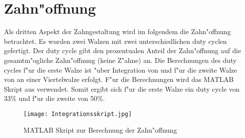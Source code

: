 \section{Zahn"offnung}
Als dritten Aspekt der Zahngestaltung wird im folgendem die Zahn"offnung betrachtet. Es wurden zwei Walzen mit zwei unterschiedlichen duty cyclen gefertigt. Der duty cycle gibt den prozentualen Anteil der Zahn"offnung auf die gesamtm"ogliche Zahn"offnung (keine Z"ahne) an. Die Berechnungen des duty cycles f"ur die erste Walze ist "uber Integration von  und f"ur die zweite Walze von  an einer Viertelwalze erfolgt. F"ur die Berechnungen wird das MATLAB Skript aus  verwendet. Somit ergibt sich f"ur die erste Walze ein duty cycle von 33\% und f"ur die zweite von 50\%.
\begin{figure}[h]
	\centering
	\texttt{[image: Integrationsskript.jpg]}
	\caption{MATLAB Skript zur Berechnung der Zahn"offnung}
	\label{fig:Integrationsskript}
\end{figure}\\




